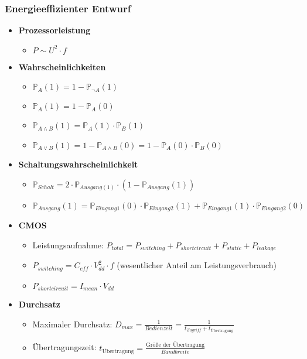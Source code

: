 \subsubsection{Energieeffizienter Entwurf}
\begin{itemize}
	\item \textbf{Prozessorleistung}
	\begin{itemize}
		\item \(P \sim U^2 \cdot f\)
	\end{itemize}
	\item \textbf{Wahrscheinlichkeiten}
	\begin{itemize}
		\item \(\mathbb{P}_A(1) = 1 - \mathbb{P}_{\neg A}(1)\)
		\item \(\mathbb{P}_A(1) = 1 - \mathbb{P}_A(0)\)
		\item \(\mathbb{P}_{A \land B}(1) = \mathbb{P}_A(1) \cdot \mathbb{P}_B(1)\)
		\item \(\mathbb{P}_{A \lor B}(1) = 1 - \mathbb{P}_{A \land B}(0) = 1 - \mathbb{P}_A(0) \cdot \mathbb{P}_B(0)\)
	\end{itemize}
	\item \textbf{Schaltungswahrscheinlichkeit}
	\begin{itemize}
		\item \(\mathbb{P}_{Schalt} = 2 \cdot \mathbb{P}_{Ausgang(1)} \cdot (1-\mathbb{P}_{Ausgang}(1))\)
		\item \(\mathbb{P}_{Ausgang}(1) = \mathbb{P}_{Eingang1}(0) \cdot \mathbb{P}_{Eingang2}(1) + \mathbb{P}_{Eingang1}(1) \cdot \mathbb{P}_{Eingang2}(0)\)
	\end{itemize}
	\item \textbf{CMOS}
	\begin{itemize}
		\item Leistungsaufnahme: \(P_{total} = P_{switching} + P_{shortcircuit} + P_{static} + P_{leakage}\)
		\item \(P_{switching} = C_{eff} \cdot V_{dd}^2 \cdot f\) (wesentlicher Anteil am Leistungsverbrauch)
		\item \(P_{shortcircuit} = I_{mean} \cdot V_{dd}\)
	\end{itemize}
	\item \textbf{Durchsatz}
	\begin{itemize}
		\item Maximaler Durchsatz: \(D_{max} = \frac{1}{Bedienzeit} = \frac{1}{t_{Zugriff} + t_{\text{Übertragung}}}\)
		\item Übertragungszeit: \(t_{\text{Übertragung}} = \frac{\text{Größe der Übertragung}}{Bandbreite}\)
	\end{itemize}
\end{itemize}

